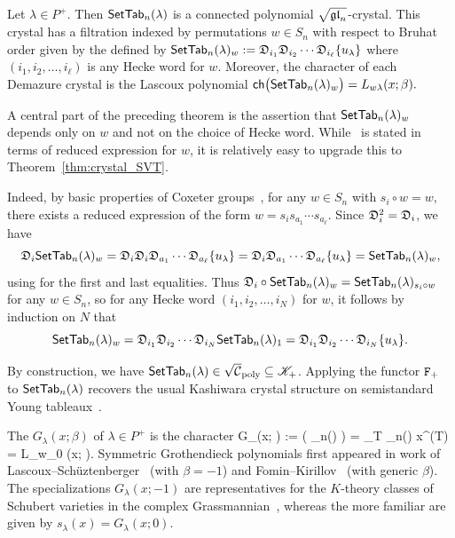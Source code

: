 \documentclass[11pt]{article}
\begin{document}
\begin{theorem}
\label{thm:crystal_SVT}
Let $\lambda \in P^+$.
Then $\SetTab_n(\lambda)$ is a connected polynomial $\sqgln$-crystal. This crystal has a filtration indexed by permutations $w \in S_n$ with respect to Bruhat order given by the 
defined by
$
\SetTab_n(\lambda)_w := \fkD_{i_1} \fkD_{i_2} \cdots \fkD_{i_{\ell}} \{ u_{\lambda} \}
$
where $(i_1,i_2,\dots,i_\ell)$ is any Hecke word  for $w$.
Moreover, the 
character of each Demazure crystal is the Lascoux polynomial
$
\ch \bigl( \SetTab_n(\lambda)_w \bigr) = L_{w\lambda}(x; \beta) .
$
\end{theorem}

\begin{remark}
A central part of the preceding theorem is the assertion that
$\SetTab_n(\lambda)_w$ depends only on $w$ and not on the choice of Hecke word.
While~\cite[Thm.~5.1]{Yu23} is stated in terms of reduced expression for $w$, it is relatively easy to upgrade this to  Theorem~\ref{thm:crystal_SVT}.

Indeed, by basic properties of Coxeter groups~\cite[\S5.8]{Humphreys90}, for any $w \in S_n$ with $s_i \circ w = w$, there exists a reduced expression of the form $w = s_i s_{a_1} \cdots s_{a_{\ell}}  $.
Since $\fkD_i^2 = \fkD_i$, we have 
\[\fkD_i \SetTab_n(\lambda)_w = \fkD_i \fkD_i\fkD_{a_1}\cdots \fkD_{a_\ell} \{u_\lambda\} = \fkD_i\fkD_{a_1}\cdots \fkD_{a_\ell} \{u_\lambda\} = \SetTab_n(\lambda)_w,\]
using \cite[Thm.~5.1]{Yu23} for the first and last equalities.
%
Thus  $\fkD_i \circ \SetTab_n(\lambda)_w = \SetTab_n(\lambda)_{s_i\circ w}$
for any $w \in S_n$,
so for any Hecke word $(i_1, i_2,\dotsc, i_N)$ for $w$, it follows by induction on $N$ that
\[
\SetTab_n(\lambda)_w=
\fkD_{i_1} \fkD_{i_2} \cdots \fkD_{i_N}  \SetTab_n(\lambda)_1 = \fkD_{i_1}\fkD_{i_2}  \cdots \fkD_{i_N}  \{u_\lambda\}.
\]
\end{remark}

By construction, we have $\SetTab_n(\lambda) \in \sqrt{\cC}_{\poly} \subseteq \sK_+$.
Applying the functor $\defectF{2}$ to $\SetTab_n(\lambda)$ recovers the usual Kashiwara crystal structure on semistandard Young tableaux~\cite{KN94}. %


The   $G_{\lambda}(x; \beta)$
of $\lambda \in P^+$ is the character 
\be\label{G-def1-eq}
G_{\lambda}(x; \beta) := \ch \bigl( \SetTab_n(\lambda) \bigr) = \sum_{T \in \SetTab_n(\lambda)} x^{\weight(T)} = L_{w_0 \lambda}(x; \beta).
\ee
Symmetric Grothendieck polynomials first appeared in work of Lascoux--Sch\"uzten\-berger~\cite{LS82,LS83} (with $\beta = -1$) and Fomin--Kirillov~\cite{FK1994} (with generic $\beta$).
The specializations $G_{\lambda}(x;-1)$ are representatives for the $K$-theory classes of Schubert varieties in the complex Grassmannian~\cite[Thm.~8.1]{Buch2002}, whereas the more familiar  are given by $s_{\lambda}(x) = G_{\lambda}(x; 0)$.
\end{document}
